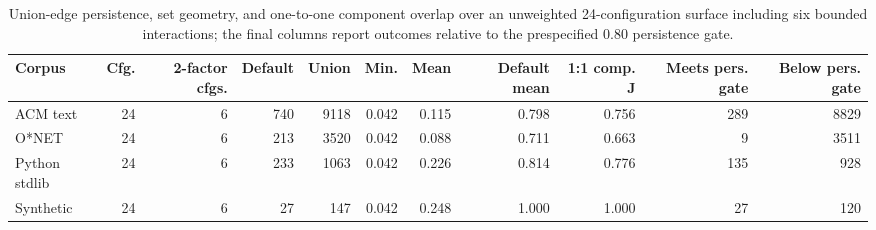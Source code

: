 \begin{table}[t]
  \caption{Union-edge persistence, set geometry, and one-to-one component overlap over an unweighted 24-configuration surface including six bounded interactions; the final columns report outcomes relative to the prespecified 0.80 persistence gate.}
  \label{tab:specification-surface}
  \centering
  \small
  \setlength{\tabcolsep}{1.2pt}
  \begin{tabular}{lrrrrrrrrrr@{}}
    \toprule
    Corpus & Cfg. & 2-factor cfgs. & Default & Union & Min. & Mean & Default mean & 1:1 comp. J & Meets pers. gate & Below pers. gate \\
    \midrule
    ACM text & 24 & 6 & 740 & 9118 & 0.042 & 0.115 & 0.798 & 0.756 & 289 & 8829 \\
    O*NET & 24 & 6 & 213 & 3520 & 0.042 & 0.088 & 0.711 & 0.663 & 9 & 3511 \\
    Python stdlib & 24 & 6 & 233 & 1063 & 0.042 & 0.226 & 0.814 & 0.776 & 135 & 928 \\
    Synthetic & 24 & 6 & 27 & 147 & 0.042 & 0.248 & 1.000 & 1.000 & 27 & 120 \\
    \bottomrule
  \end{tabular}
\end{table}
